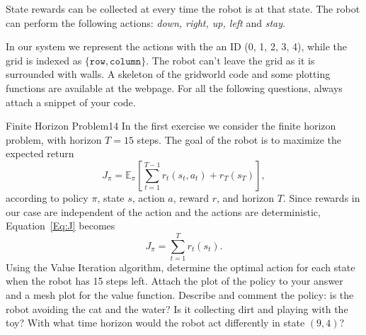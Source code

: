 State rewards can be collected at every time the robot is at that state. 
The robot can perform the following actions: \textit{down, right, up, left} and
\textit{stay}.

In our system we represent the actions with the an ID (0, 1, 2, 3, 4), while the grid is indexed as $\{ \texttt{row}, \texttt{column} \}$. The robot can't leave the grid as it is surrounded with walls.
A skeleton of the gridworld code and some plotting functions are available at the webpage.
For all the following questions, always attach a snippet of your code.


\begin{questions}

\begin{question}{Finite Horizon Problem}{14}
In the first exercise we consider the finite horizon problem, with horizon $T=15$ steps.
The goal of the robot is to maximize the expected return 
\begin{equation}
J_\pi = \mathbb{E}_\pi\left[\sum_{t=1}^{T-1}r_t(s_t,a_t)+r_T(s_T)\right], \label{Eq:J}
\end{equation}
according to policy $\pi$, state $s$, action $a$, reward $r$, and horizon $T$. Since rewards in our case are independent of the action and the actions are deterministic, Equation~\eqref{Eq:J} becomes
\begin{equation}
J_\pi = \sum_{t=1}^{T}r_t(s_t).
\end{equation}
Using the Value Iteration algorithm, determine the optimal action for each state when the robot has 15 steps left. Attach the plot of the policy to your answer and a mesh plot for the value function. Describe and comment the policy: is the robot avoiding the cat and the water? Is it collecting dirt and playing with the toy? With what time horizon would the robot act differently in state $(9,4)$?

\begin{answer}
	


\end{answer}
\end{question}
\end{questions}
